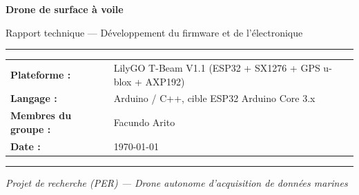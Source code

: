 \documentclass[12pt,a4paper]{article}
\begin{document}
\begin{titlepage}
  \centering
  \vspace*{2cm}
  {\Huge\bfseries Drone de surface à voile\par}
  \vspace{0.5cm}
  {\Large Rapport technique --- D\'eveloppement du firmware et de l'\'electronique\par}
  \vspace{2cm}
  \rule{\linewidth}{1pt}
  \vspace{0.5cm}

  \begin{tabular}{ll}
    \textbf{Plateforme :} & LilyGO T-Beam V1.1 (ESP32 + SX1276 + GPS u-blox + AXP192) \\[4pt]
    \textbf{Langage :}    & Arduino / C++, cible ESP32 Arduino Core 3.x \\[4pt]
    \textbf{Membres du groupe : } & Facundo Arito \\[4pt]
    \textbf{Date :}       & \today \\
  \end{tabular}

  \vspace{0.5cm}
  \rule{\linewidth}{1pt}
  \vspace{2cm}

  \begin{abstract}
    Ce document retrace l'int\'egralit\'e du d\'eveloppement informatique et
    \'electronique du drone de surface à voile bas\'e sur le module T-Beam
    d'Espressif/LilyGO. Il couvre le concept physique du v\'ehicule, le code
    original et ses limitations, la r\'e\'ecriture compl\`ete de l'architecture
    logicielle, les deux r\'evisions du PCB, le mode manuel unifi\'e avec
    propulsion bidirectionnelle, la navigation autonome à voile, l'interface de
    station sol (IHM) et, de mani\`ere d\'etaill\'ee, \textbf{tous les probl\`emes}
    rencontr\'es au cours du projet ainsi que les solutions mises en place. Une
    section finale r\'eunit les probl\`emes encore ouverts et les options
    d'am\'elioration propos\'ees pour les r\'esoudre.
  \end{abstract}

  \vfill
  \textit{Projet de recherche (PER) --- Drone autonome d'acquisition de donn\'ees marines}
\end{titlepage}

\tableofcontents
\newpage
\end{document}
